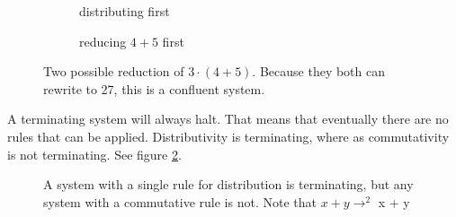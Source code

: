 \documentclass{article}
\theoremstyle{definition}
\begin{document}
\begin{figure}[h]
  \begin{subfigure}{.5\textwidth}
      \centering
      \caption{distributing first}
  \end{subfigure}
  \begin{subfigure}{.5\textwidth}
      \centering
      \caption{reducing $4 + 5$ first}
  \end{subfigure}
    \label{fig:confluent}
    \caption{Two possible reduction of $3\cdot(4 + 5)$.  Because they both can rewrite to 27, this is a confluent system.}
\end{figure}

A terminating system will always halt.
That means that eventually there are no rules that can be applied.
Distributivity is terminating, where as commutativity is not terminating.  See figure \ref{fig:terminate}.

\begin{figure}[h]
  \begin{subfigure}{.5\textwidth}
    \centering
  \end{subfigure}
  \begin{subfigure}{.5\textwidth}
    \centering
  \end{subfigure}
    \caption{A system with a single rule for distribution is terminating,
             but any system with a commutative rule is not.
             Note that $x + y \to^2$ x + y}
    \label{fig:terminate}
\end{figure}
\end{document}
